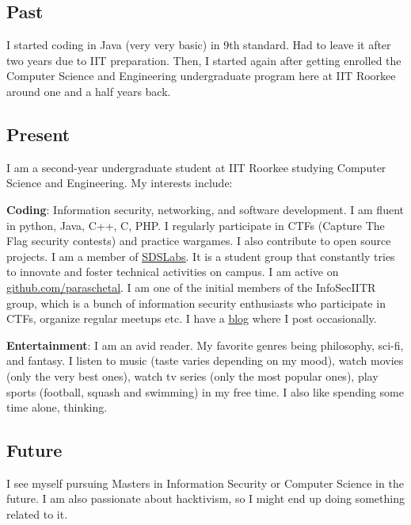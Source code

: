 \documentclass{article}
\begin{document}
\subsection{Past}
I started coding in Java (very very basic) in 9th standard. Had to leave it after two years due to IIT preparation. Then, I started again after getting enrolled the Computer Science and Engineering undergraduate program here at IIT Roorkee around one and a half years back.

\subsection{Present}
I am a second-year undergraduate student at IIT Roorkee studying Computer Science and Engineering.
My interests include:

\textbf{Coding}: Information security, networking, and software development. I am fluent in python, Java, C++, C, PHP. I regularly participate in CTFs (Capture The Flag security contests) and practice wargames. I also contribute to open source projects. I am a member of \href{https://sdslabs.co.in}{\underline{SDSLabs}}. It is a student group that constantly tries to innovate and foster technical activities on campus. I am active on \href{github}{github.com/paraschetal}. I am one of the initial members of the InfoSecIITR group, which is a bunch of information security enthusiasts who participate in CTFs, organize regular meetups etc. 
I have a \href{https://paraschetal.in}{\underline{blog}} where I post occasionally.
    
\textbf{Entertainment}: I am an avid reader. My favorite genres being philosophy, sci-fi, and fantasy. I listen to music (taste varies depending on my mood), watch movies (only the very best ones), watch tv series (only the most popular ones), play sports (football, squash and swimming) in my free time. I also like spending some time alone, thinking.

\subsection{Future}
I see myself pursuing Masters in Information Security or Computer Science in the future. I am also passionate about hacktivism, so I might end up doing something related to it.
\end{document}
